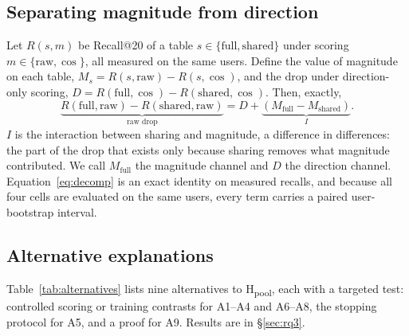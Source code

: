 \subsection{Separating magnitude from direction}\label{sec:decomposition}
Let $R(s,m)$ be Recall@20 of a table $s\in\{\mathrm{full},\mathrm{shared}\}$ under scoring $m\in\{\mathrm{raw},\cos\}$, all measured on the same users. Define the value of magnitude on each table, $M_s=R(s,\mathrm{raw})-R(s,\cos)$, and the drop under direction-only scoring, $D=R(\mathrm{full},\cos)-R(\mathrm{shared},\cos)$. Then, exactly,
\begin{equation}\label{eq:decomp}
\underbrace{R(\mathrm{full},\mathrm{raw})-R(\mathrm{shared},\mathrm{raw})}_{\text{raw drop}}
= D + \underbrace{(M_{\mathrm{full}}-M_{\mathrm{shared}})}_{I}.
\end{equation}
$I$ is the interaction between sharing and magnitude, a difference in differences: the part of the drop that exists only because sharing removes what magnitude contributed. We call $M_{\mathrm{full}}$ the magnitude channel and $D$ the direction channel. Equation~\eqref{eq:decomp} is an exact identity on measured recalls, and because all four cells are evaluated on the same users, every term carries a paired user-bootstrap interval.

\subsection{Alternative explanations}\label{sec:alternatives}
Table~\ref{tab:alternatives} lists nine alternatives to H\textsubscript{pool}, each with a targeted test: controlled scoring or training contrasts for A1--A4 and A6--A8, the stopping protocol for A5, and a proof for A9. Results are in \S\ref{sec:rq3}.

